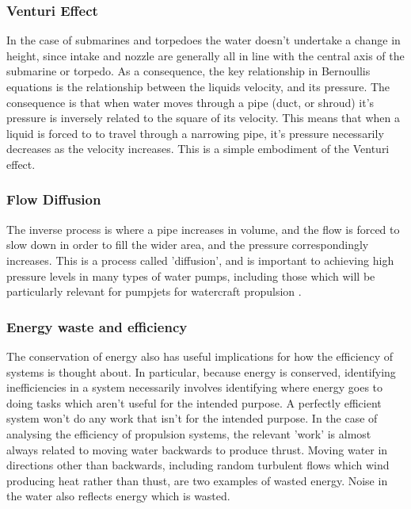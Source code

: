 \documentclass{article}\usepackage[]{graphicx}\usepackage[]{color}
\begin{document}
\subsubsection{Venturi Effect}

In the case of submarines and torpedoes the water doesn't undertake a change in height, since intake and nozzle are generally all in line with the central axis of the submarine or torpedo.  As a consequence, the key relationship in Bernoullis equations is the relationship between the liquids velocity, and its pressure.  The consequence is that when water moves through a pipe (duct, or shroud) it's pressure is inversely related to the square of its velocity.  This means that when a liquid is forced to to travel through a narrowing pipe, it's pressure necessarily decreases as the velocity increases.  This is a simple embodiment of the Venturi effect.

\subsubsection{Flow Diffusion}

The inverse process is where a pipe increases in volume, and the flow is forced to slow down in order to fill the wider area, and the pressure correspondingly increases.  This is a process called 'diffusion', and is important to achieving high pressure levels in many types of water pumps, including those which will be particularly relevant for pumpjets for watercraft propulsion \parencite{hamilton1997}.

\subsubsection{Energy waste and efficiency}
The conservation of energy also has useful implications for how the efficiency of systems is thought about.  In particular, because energy is conserved, identifying inefficiencies in a system necessarily involves identifying where energy goes to doing tasks which aren't useful for the intended purpose.  A perfectly efficient system won't do any work that isn't for the intended purpose.  In the case of analysing the efficiency of propulsion systems, the relevant 'work' is almost always related to moving water backwards to produce thrust.  Moving water in directions other than backwards, including random turbulent flows which wind producing heat rather than thust, are two examples of wasted energy.  Noise in the water also reflects energy which is wasted.
\end{document}
